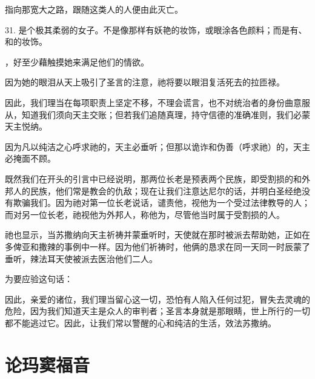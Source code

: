 指向那宽大之路，跟随这类人的人便由此灭亡。\par

31. 是个极其柔弱的女子。不是像那样有妖艳的妆饰，或眼涂各色颜料；而是有、和的妆饰。\par

，好至少藉触摸她来满足他们的情欲。\par

因为她的眼泪从天上吸引了圣言的注意，祂将要以眼泪复活死去的拉匝禄。\par

因此，我们理当在每项职责上坚定不移，不理会谎言，也不对统治者的身份曲意服从，知道我们须向天主交账；但若我们追随真理，持守信德的准确准则，我们必蒙天主悦纳。\par

因为凡以纯洁之心呼求祂的，天主必垂听；但那以诡诈和伪善（呼求祂）的，天主必掩面不顾。\par

既然我们在开头的引言中已经说明，那两位长老是预表两个民族，即受割损的和外邦人的民族，他们常是教会的仇敌；现在让我们注意达尼尔的话，并明白圣经绝没有欺骗我们。因为祂对第一位长老说话，谴责他，视他为一个受过法律教导的人；而对另一位长老，祂视他为外邦人，称他为，尽管他当时属于受割损的人。\par

祂也显示，当苏撒纳向天主祈祷并蒙垂听时，天使就在那时被派去帮助她，正如在多俾亚和撒辣的事例中一样。因为他们祈祷时，他俩的恳求在同一天同一时辰蒙了垂听，辣法耳天使被派去医治他们二人。\par

为要应验这句话：\par

因此，亲爱的诸位，我们理当留心这一切，恐怕有人陷入任何过犯，冒失去灵魂的危险，因为我们知道天主是众人的审判者；圣言本身就是那眼睛，世上所行的一切都不能逃过它。因此，让我们常以警醒的心和纯洁的生活，效法苏撒纳。\par


\section{论玛窦福音}

